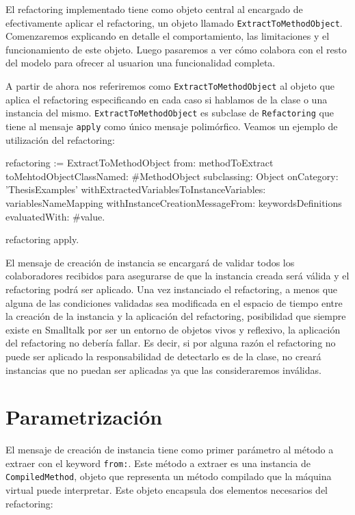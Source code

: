 
El refactoring implementado tiene como objeto central al encargado de efectivamente aplicar el refactoring,
un objeto llamado \lstinline{ExtractToMethodObject}. Comenzaremos explicando en detalle el comportamiento,
las limitaciones y el funcionamiento de este objeto. Luego pasaremos a ver cómo colabora con el resto del
modelo para ofrecer al usuarion una funcionalidad completa.

A partir de ahora nos referiremos como \lstinline{ExtractToMethodObject} al objeto que aplica el refactoring
especificando en cada caso si hablamos de la clase o una instancia del mismo. \lstinline{ExtractToMethodObject} es
subclase de \lstinline{Refactoring} que tiene al mensaje \lstinline{apply} como único mensaje polimórfico.
Veamos un ejemplo de utilización del refactoring:

\begin{code}
refactoring := ExtractToMethodObject 
    from: methodToExtract
    toMehtodObjectClassNamed: #MethodObject
    subclassing: Object
    onCategory: 'ThesisExamples'
    withExtractedVariablesToInstanceVariables: variablesNameMapping
    withInstanceCreationMessageFrom: keywordsDefinitions
    evaluatedWith: #value.

refactoring apply.
\end{code}

El mensaje de creación de instancia se encargará de validar todos los colaboradores recibidos para
asegurarse de que la instancia creada será válida y el refactoring podrá ser aplicado. Una vez
instanciado el refactoring, a menos que alguna de las condiciones validadas sea modificada en el
espacio de tiempo entre la creación de la instancia y la aplicación del refactoring, posibilidad que
siempre existe en Smalltalk por ser un entorno de objetos vivos y reflexivo, la aplicación del
refactoring no debería fallar. Es decir, si por alguna razón el refactoring no puede ser aplicado la
responsabilidad de detectarlo es de la clase, no creará instancias que no puedan ser aplicadas ya
que las consideraremos inválidas.

\section{Parametrización}
El mensaje de creación de instancia tiene como primer parámetro al método a extraer con el keyword
\lstinline{from:}. Este método a extraer es una instancia de \lstinline{CompiledMethod}, objeto que 
representa un método compilado que la máquina virtual puede interpretar. Este objeto encapsula dos
elementos necesarios del refactoring:

